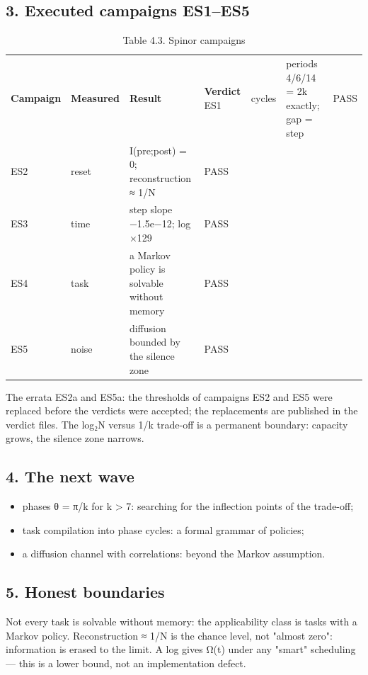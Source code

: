 \documentclass[11pt,a4paper]{article}
\begin{document}
\subsection{3. Executed campaigns ES1–ES5}

\begin{table}[htbp]\centering\small
\caption{Table 4.3. Spinor campaigns}
\begin{tabular}{p{} p{} p{} p{}}
\toprule
\textbf{Campaign} & \textbf{Measured} & \textbf{Result} & \textbf{Verdict}
\midrule
ES1 & cycles & periods 4/6/14 = 2k exactly; gap = step & PASS \\
ES2 & reset & I(pre;post) = 0; reconstruction ≈ 1/N & PASS \\
ES3 & time & step slope −1.5e−12; log ×129 & PASS \\
ES4 & task & a Markov policy is solvable without memory & PASS \\
ES5 & noise & diffusion bounded by the silence zone & PASS \\
\bottomrule
\end{tabular}
\end{table}

The errata ES2a and ES5a: the thresholds of campaigns ES2 and ES5 were replaced before the verdicts were accepted; the replacements are published in the verdict files. The log₂N versus 1/k trade-off is a permanent boundary: capacity grows, the silence zone narrows.

\subsection{4. The next wave}

\begin{itemize}
  \item phases θ = π/k for k > 7: searching for the inflection points of the trade-off;
  \item task compilation into phase cycles: a formal grammar of policies;
  \item a diffusion channel with correlations: beyond the Markov assumption.
\end{itemize}

\subsection{5. Honest boundaries}

Not every task is solvable without memory: the applicability class is tasks with a Markov policy. Reconstruction ≈ 1/N is the chance level, not "almost zero": information is erased to the limit. A log gives Ω(t) under any "smart" scheduling — this is a lower bound, not an implementation defect.
\end{document}
